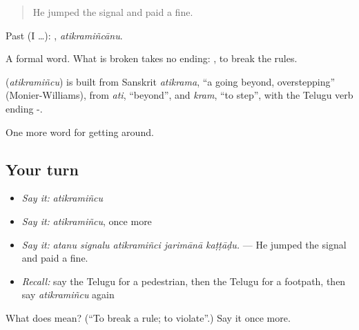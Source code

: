 \begin{quote}
He jumped the signal and paid a fine.
\end{quote}

Past (I …): , \emph{atikramiñcānu}.

A formal word. What is broken takes no ending:  , to break the rules.

\begin{cousinweb}
\textbf{} (\emph{atikramiñcu}) is built from Sanskrit \emph{atikrama}, \textquotedblleft{}a going beyond, overstepping\textquotedblright{} (Monier-Williams), from \emph{ati}, \textquotedblleft{}beyond\textquotedblright{}, and \emph{kram}, \textquotedblleft{}to step\textquotedblright{}, with the Telugu verb ending -.
\end{cousinweb}

\begin{grammarlens}[title={What you've built}]
One more word for getting around.
\end{grammarlens}

\subsection*{Your turn}
\begin{itemize}
\raggedright
  \item \emph{Say it:} \emph{atikramiñcu}
  \item \emph{Say it:} \emph{atikramiñcu}, once more
  \item \emph{Say it:} \emph{atanu signalu atikramiñci jarimānā kaṭṭāḍu.} — He jumped the signal and paid a fine.
  \item \emph{Recall:} say the Telugu for a pedestrian, then the Telugu for a footpath, then say \emph{atikramiñcu} again
\end{itemize}

\begin{tcolorbox}[breakable,colback=teal!4,colframe=teal!35!black,title={Before you move on}]
What does  mean? (\textquotedblleft{}To break a rule; to violate\textquotedblright{}.) Say it once more.
\end{tcolorbox}
